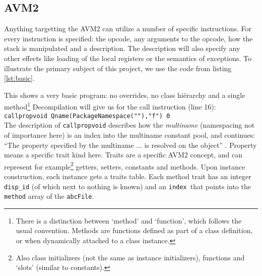 \documentclass[a4paper,11pt]{scrartcl}
\begin{document}
\subsection{AVM2}
Anything targetting the AVM2 can utilize a number of specific instructions. For every instruction is specified: the opcode, any arguments to the opcode, how the stack is manipulated and a description. The description will also specify any other effects like loading of the local registers or the semantics of exceptions. To illustrate the primary subject of this project, we use the code from listing \ref{lst:basic}.


This shows a very basic program: no overrides, no class hiërarchy and a single method\footnote{There is a distinction between `method' and `function',  which follows the usual convention. Methods are functions defined as part of a class definition, or when dynamically attached to a class instance.} Decompilation will give us for the call instruction (line 16): \\
\texttt{callpropvoid Qname(PackageNamespace(""),"f") 0} \\
The description of \texttt{callpropvoid} describes how the \textit{multiname} (namespacing not of importance here) is an index into the multiname constant pool, and continues: ``The property specified by the multiname ... is resolved on the object'' \cite{Adobe2007}. Property means a specific trait kind here. Traits are a specific AVM2 concept, and can represent for example\footnote{Also class initializers (not the same as instance initializers), functions and `slots' (similar to constants).} getters, setters, constants and methods. Upon instance construction, each instance gets a traits table. Each method trait has an integer \texttt{disp\_id} (of which next to nothing is known) and an \texttt{index }that points into the \texttt{method} array of the \texttt{abcFile}.
\end{document}
